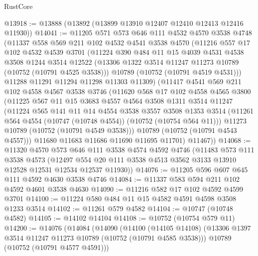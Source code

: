 \begin{lexlean}{RustCore}
\begin{coremodule}
@13918 := @13888 (@13892 (@13899 @13910 @12407 @12410 @12413 @12416 @11930))
@14041 := @11205
    @571
    @573
    @646
    @111
    @4532
    @4570
    @3538
    @4748
    (@11337
      @558
      @569
      @211
      @102
      @4532
      @4541
      @3538
      @4570
      (@11216
        @557
        @17
        @102
        @4532
        @4539
        @3701
        (@11224
          @390
          @484
          @11
          @15
          @4039
          @4531
          @4538
          @3508
          @1244
          @3514
          @12522
          (@13306 @1322 @3514 @11247 @11273 @10789 (@10752 (@10791 @4525 @3538)))
          @10789
          (@10752 (@10791 @4519 @4531)))
        @11288
        @11291
        @11294
        @11298
        @11303
        @11309)
      (@11417
        @4541
        @569
        @211
        @102
        @4558
        @4567
        @3538
        @3746
        (@11620
          @568
          @17
          @102
          @4558
          @4565
          @3800
          (@11225
            @567
            @11
            @15
            @3683
            @4557
            @4564
            @3508
            @1311
            @3514
            @11247
            (@11224
              @565
              @141
              @11
              @14
              @4554
              @3538
              @3557
              @3508
              @1353
              @3514
              (@11261 @564 @4554 (@10747 (@10748 @4554)) (@10752 (@10754 @564 @11)))
              @11273
              @10789
              (@10752 (@10791 @4549 @3538)))
            @10789
            (@10752 (@10791 @4543 @4557)))
          @11680
          @11683
          @11686
          @11690
          @11695
          @11701)
        @11467))
@14068 := @11320
    @4570
    @573
    @646
    @111
    @3538
    @4574
    @4592
    @4746
    (@11483
      @573
      @111
      @3538
      @4573
      (@12497 @554 @20 @111 @3538 @4513 @3562 @3133 @13910 @12528 @12531 @12534 @12537 @11930))
@14076 := @11205 @596 @607 @645 @111 @4592 @4630 @3538 @4746
@14084 := @11337 @583 @594 @211 @102 @4592 @4601 @3538 @4630
@14090 := @11216 @582 @17 @102 @4592 @4599 @3701
@14100 := @11224 @580 @484 @11 @15 @4582 @4591 @4598 @3508 @1233 @3514
@14102 := @11261 @579 @4582
@14104 := @10747 (@10748 @4582)
@14105 := @14102 @14104
@14108 := @10752 (@10754 @579 @11)
@14200 := @14076
    (@14084
      (@14090
        (@14100
          (@14105 @14108)
          (@13306 @1397 @3514 @11247 @11273 @10789 (@10752 (@10791 @4585 @3538)))
          @10789
          (@10752 (@10791 @4577 @4591)))

\end{coremodule}
\end{lexlean}
